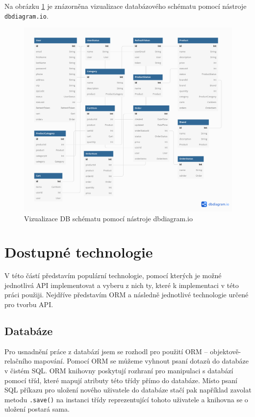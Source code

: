 \documentclass[thesis=M,czech]{FITthesis}[2019/12/23]
\begin{document}
Na obrázku \ref{schema-dbdiagram} je znázorněna vizualizace databázového schématu pomocí nástroje \texttt{dbdiagram.io}.

\begin{figure}[h]
    \includegraphics[width=\linewidth]{img/schema-dbdiagram.png}
    \caption{Vizualizace DB schématu pomocí nástroje dbdiagram.io}
	\label{schema-dbdiagram}
\end{figure}

\chapter{Dostupné technologie}
V této částí představím populární technologie, pomocí kterých je možné jednotlivá API implementovat a vyberu z nich ty, které k implementaci v této práci použiji. Nejdříve představím ORM a následně jednotlivé technologie určené pro tvorbu API.

\section{Databáze}
Pro usnadnění práce z databází jsem se rozhodl pro použití ORM -- objektově-relačního mapování. Pomocí ORM se můžeme vyhnout psaní dotazů do databáze v čistém SQL. ORM knihovny poskytují rozhraní pro manipulaci s databází pomocí tříd, které mapují atributy této třídy přímo do databáze. Místo psaní SQL příkazu pro uložení nového uživatele do databáze stačí pak například zavolat metodu \texttt{.save()} na instanci třídy reprezentující tohoto uživatele a knihovna se o uložení postará sama.
\end{document}
